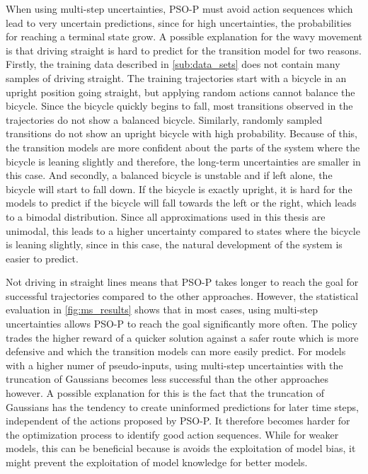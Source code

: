 When using multi-step uncertainties, PSO-P must avoid action sequences which lead to very uncertain predictions, since for high uncertainties, the probabilities for reaching a terminal state grow.
A possible explanation for the wavy movement is that driving straight is hard to predict for the transition model for two reasons.
Firstly, the training data described in \cref{sub:data_sets} does not contain many samples of driving straight.
The training trajectories start with a bicycle in an upright position going straight, but applying random actions cannot balance the bicycle.
Since the bicycle quickly begins to fall, most transitions observed in the trajectories do not show a balanced bicycle.
Similarly, randomly sampled transitions do not show an upright bicycle with high probability.
Because of this, the transition models are more confident about the parts of the system where the bicycle is leaning slightly and therefore, the long-term uncertainties are smaller in this case.
And secondly, a balanced bicycle is unstable and if left alone, the bicycle will start to fall down.
If the bicycle is exactly upright, it is hard for the models to predict if the bicycle will fall towards the left or the right, which leads to a bimodal distribution.
Since all approximations used in this thesis are unimodal, this leads to a higher uncertainty compared to states where the bicycle is leaning slightly, since in this case, the natural development of the system is easier to predict.

Not driving in straight lines means that PSO-P takes longer to reach the goal for successful trajectories compared to the other approaches.
However, the statistical evaluation in \cref{fig:ms_results} shows that in most cases, using multi-step uncertainties allows PSO-P to reach the goal significantly more often.
The policy trades the higher reward of a quicker solution against a safer route which is more defensive and which the transition models can more easily predict.
For models with a higher numer of pseudo-inputs, using multi-step uncertainties with the truncation of Gaussians becomes less successful than the other approaches however.
A possible explanation for this is the fact that the truncation of Gaussians has the tendency to create uninformed predictions for later time steps, independent of the actions proposed by PSO-P.
It therefore becomes harder for the optimization process to identify good action sequences.
While for weaker models, this can be beneficial because is avoids the exploitation of model bias, it might prevent the exploitation of model knowledge for better models.

